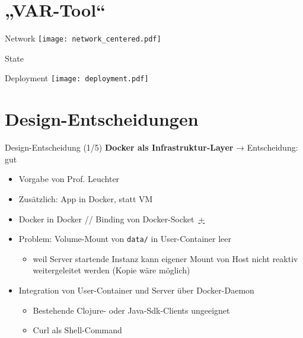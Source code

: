 \documentclass[compress]{beamer}
\begin{document}
\section{„VAR-Tool“}
\begin{frame}{Network}
  \texttt{[image: network\_centered.pdf]}
\end{frame}
\begin{frame}{State}
\end{frame}
\begin{frame}{Deployment}
  \texttt{[image: deployment.pdf]}
\end{frame}
\section{Design-Entscheidungen}
\begin{frame}{Design-Entscheidung (1/5)}
  \textbf{Docker als Infrastruktur-Layer}
  \hfill
  → Entscheidung: {\color{green} gut}
  \begin{itemize}
    \item Vorgabe von Prof. Leuchter
    \item Zusätzlich: App in Docker, statt VM
    \item Docker in Docker // Binding von Docker-Socket~\href{https://jpetazzo.github.io/2015/09/03/do-not-use-docker-in-docker-for-ci/}{\color{orange}+}
    \item Problem: Volume-Mount von \texttt{data/} in User-Container leer
      \begin{itemize}
        \item weil Server startende Instanz kann eigener Mount von Host nicht reaktiv weitergeleitet werden (Kopie wäre möglich)
      \end{itemize}
    \item Integration von User-Container und Server über Docker-Daemon
      \begin{itemize}
        \item Bestehende Clojure- oder Java-Sdk-Clients ungeeignet
        \item Curl als Shell-Command
      \end{itemize}
  \end{itemize}
\end{frame}
\end{document}
